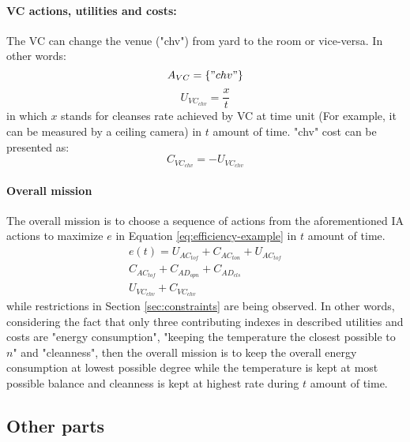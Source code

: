 \documentclass{article}
\begin{document}
\begin{multicols}{2}
				\paragraph{VC actions, utilities and costs:}	
					The VC can change the venue ("chv") from yard to the room or vice-versa. In other words:
					\begin{equation}
						A_{VC}=\{"chv"\}
						\label{eq:vc-actions}
					\end{equation}
					\begin{equation}
						U_{{VC}_{chv}} = \frac{x}{t}
						\label{eq:vc-action-utility-chv}
					\end{equation}
					in which $x$ stands for cleanses rate achieved by VC at time unit  (For example, it can be measured by a ceiling camera) in $t$ amount of time. "chv" cost can be presented as: 
					\begin{equation}
						C_{{VC}_{chv}} = - U_{{VC}_{chv}}
						\label{eq:vc-action-cost-chv}
					\end{equation}
					
					\paragraph{Overall mission}
						The overall mission is to choose a sequence of actions from the aforementioned IA actions to maximize $e$ in Equation \ref{eq:efficiency-example} in $t$ amount of time. 
						\begin{multline}
							e(t) = U_{{AC}_{tof}} + C_{{AC}_{ton}} + U_{{AC}_{tof}}
							\\
							C_{{AC}_{tof}} + C_{{AD}_{opn}} + C_{{AD}_{cls}}
							\\
							U_{{VC}_{chv}} + C_{{VC}_{chv}}
							\label{eq:efficiency-example}
						\end{multline}
						while restrictions in Section \ref{sec:constraints} are being observed. 
						In other words, considering the fact that only three contributing indexes in described utilities and costs are "energy consumption", "keeping the temperature the closest possible to $n$" and "cleanness", then the overall mission is to keep the overall energy consumption at lowest possible degree while the temperature is kept at most possible balance and cleanness is kept at highest rate during $t$ amount of time.       
					
		\subsection{Other parts}

\end{multicols}
\end{document}

